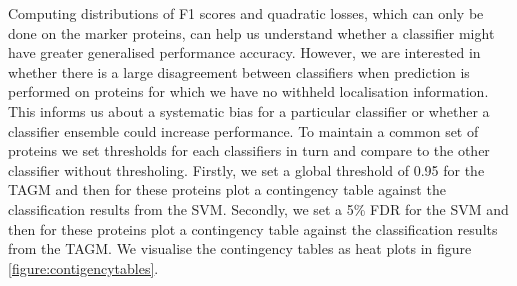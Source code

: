 \documentclass[12pt,english]{article}\usepackage[]{graphicx}\usepackage[]{color}
\begin{document}
Computing distributions of F1 scores and quadratic losses, which can only be done
on the marker proteins, can help us
understand whether a classifier might have greater generalised
performance accuracy. However, we are interested in whether there is a
large disagreement between classifiers when prediction is performed on
proteins for which we have no withheld localisation information. This
informs us about a systematic bias for a particular classifier or
whether a classifier ensemble could increase performance. To maintain
a common set of proteins we set thresholds for each classifiers in turn
and compare to the other classifier without thresholing. Firstly, we
set a global threshold of 0.95 for the TAGM and then for these
proteins plot a contingency table against the classification results
from the SVM. Secondly, we set a 5\% FDR for the SVM and then for
these proteins plot a contingency table against the classification
results from the TAGM. We visualise the contingency tables as heat
plots in figure \ref{figure:contigencytables}.
\end{document}
